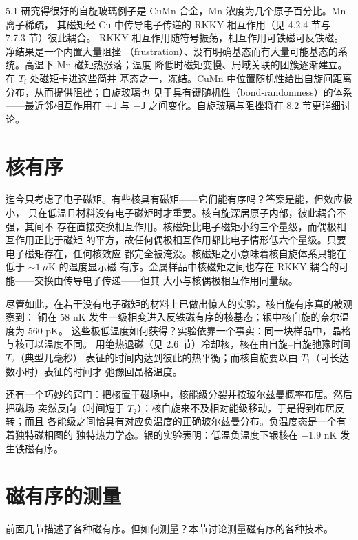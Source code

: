 \begin{example}{5.1}
研究得很好的自旋玻璃例子是 CuMn 合金，Mn 浓度为几个原子百分比。Mn 离子稀疏，
其磁矩经 Cu 中传导电子传递的 RKKY 相互作用（见 4.2.4 节与 7.7.3 节）彼此耦合。
RKKY 相互作用随符号振荡，相互作用可铁磁可反铁磁。净结果是一个内置大量阻挫
（frustration）、没有明确基态而有大量可能基态的系统。高温下 Mn 磁矩热涨落；温度
降低时磁矩变慢、局域关联的团簇逐渐建立。在 $T_{\mathrm{f}}$ 处磁矩卡进这些简并
基态之一，冻结。CuMn 中位置随机性给出自旋间距离分布，从而提供阻挫；自旋玻璃也
见于具有键随机性（bond-randomness）的体系——最近邻相互作用在 $+\mathsf{J}$ 与
$-\mathsf{J}$ 之间变化。自旋玻璃与阻挫将在 8.2 节更详细讨论。
\end{example}

\section{核有序}

迄今只考虑了电子磁矩。有些核具有磁矩——它们能有序吗？答案是能，但效应极小，
只在低温且材料没有电子磁矩时才重要。核自旋深居原子内部，彼此耦合不强，其间不
存在直接交换相互作用。核磁矩比电子磁矩小约三个量级，而偶极相互作用正比于磁矩
的平方，故任何偶极相互作用都比电子情形低六个量级。只要电子磁矩存在，任何核效应
都完全被淹没。核磁矩之小意味着核自旋体系只能在低于 $\sim1\ \mu$K 的温度显示磁
有序。金属样品中核磁矩之间也存在 RKKY 耦合的可能——交换由传导电子传递——但其
大小与核偶极相互作用同量级。

尽管如此，在若干没有电子磁矩的材料上已做出惊人的实验，核自旋有序真的被观察到：
铜在 58 nK 发生一级相变进入反铁磁有序的核基态；银中核自旋的奈尔温度为 560 pK。
这些极低温度如何获得？实验依靠一个事实：同一块样品中，晶格与核可以温度不同。
用绝热退磁（见 2.6 节）冷却核，核在由自旋--自旋弛豫时间 $T_2$（典型几毫秒）
表征的时间内达到彼此的热平衡；而核自旋要以由 $T_1$（可长达数小时）表征的时间才
弛豫回晶格温度。

还有一个巧妙的窍门：把核置于磁场中，核能级分裂并按玻尔兹曼概率布居。然后把磁场
突然反向（时间短于 $T_2$）：核自旋来不及相对能级移动，于是得到布居反转；而且
各能级之间恰具有对应负温度的正确玻尔兹曼分布。负温度态是一个有着独特磁相图的
独特热力学态。银的实验表明：低温负温度下银核在 $-1.9$ nK 发生铁磁有序。

\section{磁有序的测量}

前面几节描述了各种磁有序。但如何测量？本节讨论测量磁有序的各种技术。

